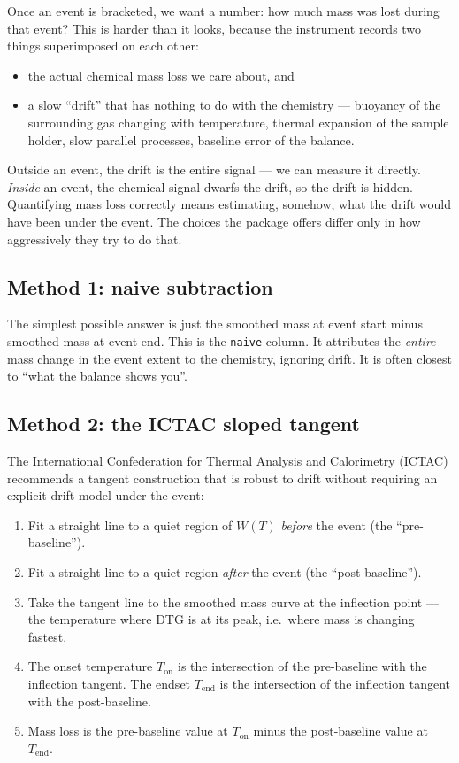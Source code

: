 \documentclass[11pt]{article}
\newcommand{\code}[1]{\texttt{#1}}
\begin{document}
Once an event is bracketed, we want a number: how much mass was lost
during that event? This is harder than it looks, because the
instrument records two things superimposed on each other:

\begin{itemize}
  \item the actual chemical mass loss we care about, and
  \item a slow ``drift'' that has nothing to do with the chemistry ---
        buoyancy of the surrounding gas changing with temperature,
        thermal expansion of the sample holder, slow parallel processes,
        baseline error of the balance.
\end{itemize}

Outside an event, the drift is the entire signal --- we can measure it
directly. \emph{Inside} an event, the chemical signal dwarfs the
drift, so the drift is hidden. Quantifying mass loss correctly means
estimating, somehow, what the drift would have been under the event.
The choices the package offers differ only in how aggressively they
try to do that.

\subsection{Method 1: naive subtraction}

The simplest possible answer is just the smoothed mass at event start
minus smoothed mass at event end. This is the \code{naive} column. It
attributes the \emph{entire} mass change in the event extent to the
chemistry, ignoring drift. It is often closest to ``what the balance
shows you''.

\subsection{Method 2: the ICTAC sloped tangent}

The International Confederation for Thermal Analysis and Calorimetry
(ICTAC) recommends a tangent construction that is robust to drift
without requiring an explicit drift model under the event:

\begin{enumerate}
  \item Fit a straight line to a quiet region of $W(T)$ \emph{before}
        the event (the ``pre-baseline'').
  \item Fit a straight line to a quiet region \emph{after} the event
        (the ``post-baseline'').
  \item Take the tangent line to the smoothed mass curve at the
        inflection point --- the temperature where DTG is at its peak,
        i.e.\ where mass is changing fastest.
  \item The onset temperature $T_{\mathrm{on}}$ is the intersection of
        the pre-baseline with the inflection tangent. The endset
        $T_{\mathrm{end}}$ is the intersection of the inflection
        tangent with the post-baseline.
  \item Mass loss is the pre-baseline value at $T_{\mathrm{on}}$ minus
        the post-baseline value at $T_{\mathrm{end}}$.
\end{enumerate}
\end{document}
